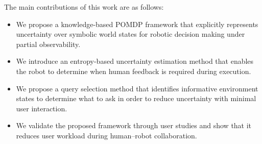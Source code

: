 

The main contributions of this work are as follows:
\begin{itemize}
    \item We propose a knowledge-based POMDP framework that explicitly represents uncertainty over symbolic world states for robotic decision making under partial observability.
    
    \item We introduce an entropy-based uncertainty estimation method that enables the robot to determine when human feedback is required during execution.
    
    \item We propose a query selection method that identifies informative environment states to determine what to ask in order to reduce uncertainty with minimal user interaction.
    
    \item We validate the proposed framework through user studies and show that it reduces user workload during human--robot collaboration.
\end{itemize}

